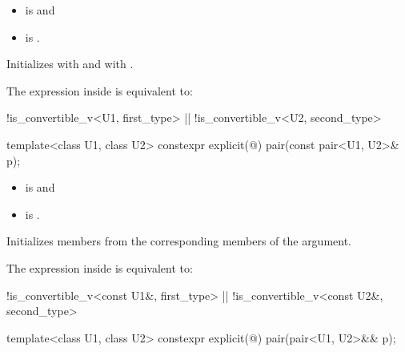 \begin{itemdescr}
\pnum
\constraints
\begin{itemize}
\item {} is  and
\item {} is .
\end{itemize}

\pnum
\effects
Initializes  with
 and 
with .

\pnum
\remarks
The expression inside  is equivalent to:
\begin{codeblock}
!is_convertible_v<U1, first_type> || !is_convertible_v<U2, second_type>
\end{codeblock}
\end{itemdescr}

%
\begin{itemdecl}
template<class U1, class U2> constexpr explicit(@\seebelow@) pair(const pair<U1, U2>& p);
\end{itemdecl}

\begin{itemdescr}
\pnum
\constraints
\begin{itemize}
\item {} is  and
\item {} is .
\end{itemize}

\pnum
\effects
Initializes members from the corresponding members of the argument.

\pnum
\remarks
The expression inside  is equivalent to:
\begin{codeblock}
!is_convertible_v<const U1&, first_type> || !is_convertible_v<const U2&, second_type>
\end{codeblock}
\end{itemdescr}

%
\begin{itemdecl}
template<class U1, class U2> constexpr explicit(@\seebelow@) pair(pair<U1, U2>&& p);
\end{itemdecl}

